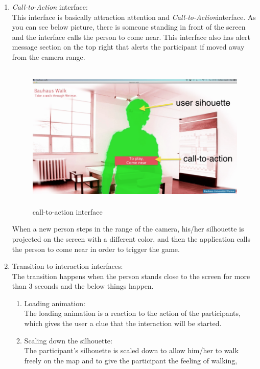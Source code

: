 \begin{enumerate}

\item \emph{Call-to-Action} interface: \\
This interface is basically attraction attention and \emph{Call-to-Action}interface. As you can see below picture, there is someone standing in front of the screen and the interface calls the person to come near. This interface also has alert message section on the top right that alerts the participant if moved away from the camera range. 

\begin{figure}[H]
    \centering
    \includegraphics[width=120mm,height=70mm]{Figures/6/body/first_interface}
    \caption{call-to-action interface}%
    \label{fig:body_firstinterface}%
\end{figure}

When a new person steps in the range of the camera, his/her silhouette is projected on the screen with a different color, and then the application calls the person to come near in order to trigger the game.


\item Transition to interaction interfaces: \\
The transition happens when the person stands close to the screen for more than 3 seconds and the below things happen.

\begin{enumerate}
\item Loading animation:\\
 The loading animation is a reaction to the action of the participants, which gives the user a clue that the interaction will be started. 

\item Scaling down the silhouette: \\
The participant's silhouette is scaled down to allow him/her to walk freely on the map and to give the participant the feeling of walking, 


\end{enumerate}
\end{enumerate}
